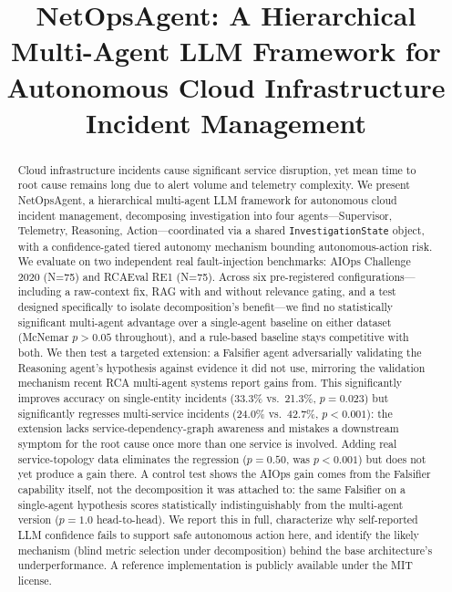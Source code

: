 \documentclass[10pt,conference]{IEEEtran}
\begin{document}
\title{NetOpsAgent: A Hierarchical Multi-Agent LLM Framework for Autonomous Cloud Infrastructure Incident Management}

\author{
}

\maketitle

\begin{abstract}
Cloud infrastructure incidents cause significant service disruption, yet mean
time to root cause remains long due to alert volume and telemetry complexity.
We present NetOpsAgent, a hierarchical multi-agent LLM framework for
autonomous cloud incident management, decomposing investigation into four
agents---Supervisor, Telemetry, Reasoning, Action---coordinated via a shared
\texttt{InvestigationState} object, with a confidence-gated tiered autonomy
mechanism bounding autonomous-action risk. We evaluate on two independent
real fault-injection benchmarks: AIOps Challenge 2020 (N=75) and RCAEval RE1
(N=75). Across six pre-registered configurations---including a raw-context
fix, RAG with and without relevance gating, and a test designed specifically
to isolate decomposition's benefit---we find no statistically significant
multi-agent advantage over a single-agent baseline on either dataset
(McNemar $p>0.05$ throughout), and a rule-based baseline stays competitive
with both. We then test a targeted extension: a Falsifier agent adversarially
validating the Reasoning agent's hypothesis against evidence it did not
use, mirroring the validation mechanism recent RCA multi-agent systems
report gains from. This significantly improves accuracy on single-entity
incidents (33.3\% vs.\ 21.3\%, $p=0.023$) but significantly regresses
multi-service incidents (24.0\% vs.\ 42.7\%, $p<0.001$): the extension
lacks service-dependency-graph awareness and mistakes a downstream symptom
for the root cause once more than one service is involved. Adding real service-topology data eliminates
the regression ($p=0.50$, was $p<0.001$) but does not yet produce a gain
there. A control test shows the AIOps gain comes from the Falsifier
capability itself, not the decomposition it was attached to: the same
Falsifier on a single-agent hypothesis scores statistically
indistinguishably from the multi-agent version ($p=1.0$ head-to-head). We
report this in full, characterize why self-reported LLM confidence fails
to support safe autonomous action here, and identify the likely mechanism
(blind metric selection under decomposition) behind the base
architecture's underperformance. A reference implementation is publicly
available under the MIT license.
\end{abstract}
\end{document}
